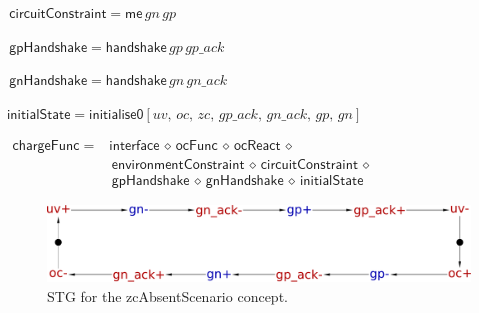 \documentclass[british,compsoc]{IEEEtran}
\begin{document}
\begin{minipage}[h]{1\columnwidth}
\begin{flushleft}
$\,\mathsf{\mathsf{circuitConstraint}}=\mathsf{me}\,gn\, gp$
\par\end{flushleft}

\begin{flushleft}
$\,\mathsf{gpHandshake}=\mathsf{handshake}\,gp\,gp\_ack$
\par\end{flushleft}

\begin{flushleft}
$\,\mathsf{gnHandshake}=\mathsf{handshake}\, gn\, gn\_ack$
\par\end{flushleft}

\begin{flushleft}
$\mathsf{initialState}=\mathsf{initialise0}[uv,\, oc,\, zc,\, gp\_ack,\, gn\_ack,\, gp,\, gn]$
\par\end{flushleft}

\begin{flushleft}
$\begin{aligned}\mathsf{chargeFunc}= & \mathsf{interface}\,\diamond\,\mathsf{ocFunc}\,\diamond\,\mathsf{ocReact}\,\diamond\\
 & \mathsf{\mathsf{\, environmentConstraint}\,\diamond\, circuitConstraint}\,\diamond\,\\
 & \mathsf{\, gpHandshake}\,\diamond\,\mathsf{gnHandshake}\,\diamond\,\mathsf{initialState}
\end{aligned}
$
\par\end{flushleft}


\end{minipage}

\begin{flushleft}
\begin{figure}[H]
\begin{centering}
\includegraphics[scale=0.22]{Images/stg-UV_without_ZC}
\par\end{centering}

\protect\caption{\label{fig:zcAbsentScenario STG} STG for the \textsf{zcAbsentScenario}
concept.}
\end{figure}

\par\end{flushleft}
\end{document}
